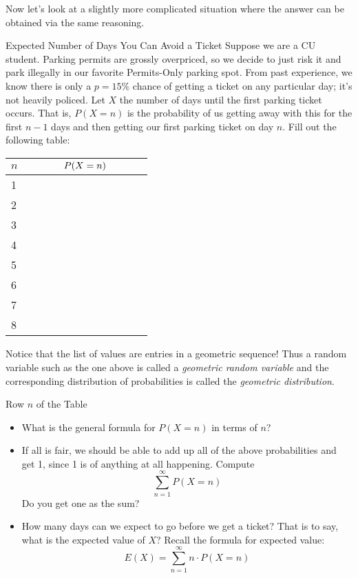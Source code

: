 Now let's look at a slightly more complicated situation where the answer can be obtained via the same reasoning.

\begin{exercise}{Expected Number of Days You Can Avoid a Ticket \Coffeecup \Coffeecup \Coffeecup}
Suppose we are a CU student.  Parking permits are grossly overpriced, so we decide to just risk it and park illegally in our favorite Permits-Only parking spot.  From past experience, we know there is only a $p=15\%$ chance of getting a ticket on any particular day; it's not heavily policed.  Let $X$ the number of days until the first parking ticket occurs. That is, $P(X=n)$ is the probability of us getting away with this for the first $n-1$ days and then getting our first parking ticket on day $n$.  Fill out the following table: 

\begin{center}
  \begin{tabular}{|| l || c  ||}
    \hline
    $n$ & $\hspace{.5in} P(X=n) \hspace{.5in} $   \\ \hline
    1 &   \\ \hline
    2 &   \\ \hline
    3 &   \\ \hline
    4 &   \\ \hline
    5 &   \\ \hline
    6 &   \\ \hline
    7 &   \\ \hline
    8 &   \\ \hline
 \end{tabular}
\end{center}
\end{exercise}

Notice that the list of  values are entries in a geometric sequence!  Thus a random variable such as the one above is called a \emph{geometric random variable} and the corresponding distribution of probabilities is called the \emph{geometric distribution}.

\begin{exercise}{Row $n$ of the Table \Coffeecup \Coffeecup \Coffeecup}
\begin{itemize}
\item  What is the general formula for $P(X=n)$ in terms of $n$?
\vspace*{1in}
\item If all is fair, we should be able to add up all of the above probabilities and get 1, since 1 is  of anything at all happening.  Compute $$ \sum_{n=1}^{\infty} P(X=n)$$  Do you get one as the sum? 
\vspace*{1in}
\item How many days can we expect to go before we get a ticket?  That is to say, what is the expected value of $X$?  Recall the formula for expected value: $$ E(X)=\sum_{n=1}^{\infty} n\cdot P(X=n)$$
\vspace*{2in}
\end{itemize}
\end{exercise}

